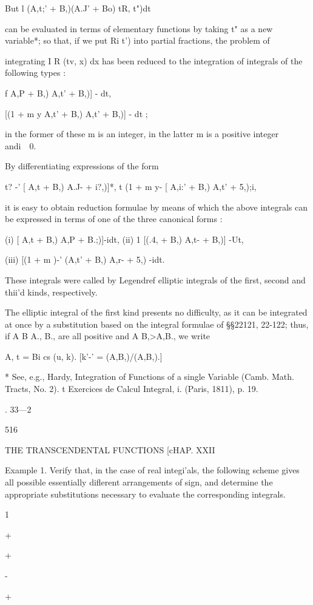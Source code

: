 But l (A,t;' + B,)(A.J' + Bo) tR, t")dt

can be evaluated in terms of elementary functions by taking t" as a
new variable*; so that, if we put Ri t') into partial fractions, the
problem of

integrating I R (tv, x) dx has been reduced to the integration of
integrals of the following types :

 f A,P + B,) A,t' + B,)] - dt,

[(1 + m y A,t' + B,) A,t' + B,)] - dt ;

in the former of these m is an integer, in the latter m is a positive
integer andi\ \ 0.

By differentiating expressions of the form

t? -' [ A,t + B,) A.J- + i?,)]*, t (1 + m y- [ A,i:' + B,) A,t' +
5,);i,

it is easy to obtain reduction formulae by means of which the above
integrals can be expressed in terms of one of the three canonical
forms :

(i) [ A,t + B,) A,P + B.;)]-idt, (ii) 1 [(.4, + B,) A,t- + B,)] -Ut,

(iii) [(1 + m )-' (A,t' + B,) A,r- + 5,) -idt.

These integrals were called by Legendref elliptic integrals of the
first, second and thii'd kinds, respectively.

The elliptic integral of the first kind presents no difficulty, as it
can be integrated at once by a substitution based on the integral
formulae of §§22121, 22-122; thus, if A B A., B., are all positive and
A B,>A,B., we write

A, t = Bi cs (u, k). [k'-' = (A,B,)/(A,B,).]

* See, e.g., Hardy, Integration of Functions of a single Variable
(Camb. Math. Tracts, No. 2). t Exercices de Calcul Integral, i.
(Paris, 1811), p. 19.

. 33—2

516

THE TRANSCENDENTAL FUNCTIONS [cHAP. XXII

Example 1. Verify that, in the case of real integi'als, the following
scheme gives all possible essentially diflerent arrangements of sign,
and determine the appropriate substitutions necessary to evaluate the
corresponding integrals.

 1

+

+

-

+


